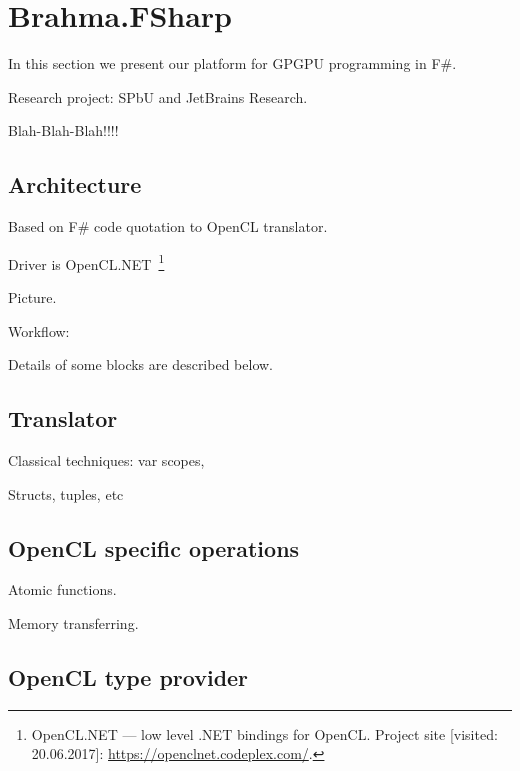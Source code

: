 \section{Brahma.FSharp}

In this section we present our platform for GPGPU programming in F\#.

Research project: SPbU and JetBrains Research.

Blah-Blah-Blah!!!!

\subsection{Architecture}

Based on F\# code quotation to OpenCL translator.

Driver is OpenCL.NET~\footnote{OpenCL.NET --- low level .NET bindings for OpenCL. Project site [visited: 20.06.2017]: \url{https://openclnet.codeplex.com/}.}

Picture.

Workflow:

Details of some blocks are described below.


\subsection{Translator}

Classical techniques: var scopes,

Structs, tuples, etc

\subsection{OpenCL specific operations}

Atomic functions.

Memory transferring.

\subsection{OpenCL type provider}